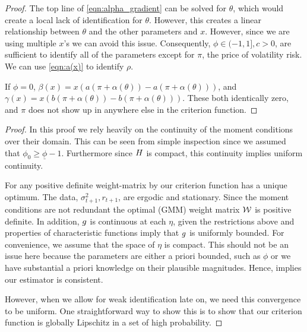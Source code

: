\documentclass[11pt, letterpaper, twoside, final]{article}
\begin{document}
\begin{appendices}
\begin{proof}
    The top line of \cref{eqn:alpha_gradient} can be solved for $\theta$, which would create a local lack of
    identification for $\theta$.
    However, this creates a linear relationship between $\theta$ and the other parameters and $x$.
    However, since we are using multiple $x$'s we can avoid this issue.
    Consequently,  $\phi \in (-1,1], c > 0$, are sufficient to identify all of the parameters except for $\pi$,
    the price of volatility risk.
    We can use \cref{eqn:a(x)} to identify $\rho$.
    
    If $\phi = 0$, $\beta(x) = x \left(a (\pi + \alpha(\theta)) - a(\pi + \alpha(\theta))\right)$, and
    $\gamma(x) =  x \left(b (\pi + \alpha(\theta)) - b(\pi + \alpha(\theta))\right)$.
    These both  identically zero, and $\pi$ does not show up in anywhere  else in the criterion function.
    
    \end{proof}


\UllnStrongID*

\begin{proof}

    In this proof we rely heavily on the continuity of the moment conditions over their domain. 
    This can be seen from simple inspection since we assumed that $\phi_0 \geq \underline{\phi} -1$.
    Furthermore since $H$ is compact, this continuity implies uniform continuity.
    
    For any positive definite weight-matrix by \textcite[Lemma 2.3]{newey1994large} our criterion function has
    a unique optimum.
    The data, $\sigma^2_{t+1}, r_{t+1}$, are ergodic and stationary.
    Since the moment conditions are not redundant the optimal (GMM) weight matrix $\mathcal{W}$ is positive definite. 
    In addition, $g$ is continuous at each $\eta$, given the restrictions above and properties of
    characteristic functions imply that $g$ is uniformly bounded. 
    For convenience, we assume that the space of $\eta$ is compact.
    This should not be an issue here because the parameters  are either a priori bounded, such as $\phi$ or we
    have substantial a priori knowledge on their plausible magnitudes.
    Hence, \textcite[Theroem 2.6]{newey1994large} implies our estimator is consistent.
    
    However, when we allow for weak identification late on, we need this convergence to be uniform. 
    One straightforward way to show this is to show that our criterion function is globally Lipschitz in a set of
    high probability. 
    

\end{proof}
\end{appendices}
\end{document}
